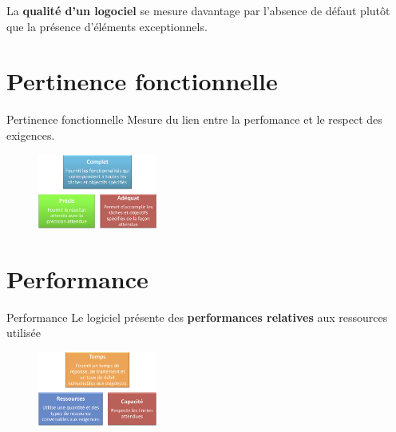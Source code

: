 \documentclass[16pt]{report}
\begin{document}
\begin{multicols*}{2}
        \begin{note}{}{}
            La \textbf{qualité d'un logociel} se mesure davantage par l'absence de défaut 
            plutôt que la présence d'éléments exceptionnels.
        \end{note}

        \section{Pertinence fonctionnelle}
        
        \begin{Concept}{Pertinence fonctionnelle}{}
            Mesure du lien entre la perfomance et le respect des exigences.
        \end{Concept}

        \begin{figure}[H]
            \begin{center}
                \includegraphics[width=0.35\textwidth]{perti.png}
            \end{center}
        \end{figure}


        \section{Performance}
        \begin{Concept}{Performance}{}
            Le logiciel présente des \textbf{performances relatives} aux ressources utilisée 
        \end{Concept}


         \begin{figure}[H]
            \begin{center}
                \includegraphics[width=0.35\textwidth]{perfo.png}
            \end{center}
        \end{figure}
       




\end{multicols*}
\end{document}

